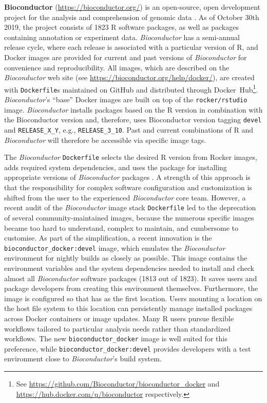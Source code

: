 \textbf{Bioconductor} (\url{https://bioconductor.org/}) is an
open-source, open development project for the analysis and comprehension
of genomic data \citep{gentleman_bioconductor_2004}. As of October 30th
2019, the project consists of 1823 R software packages, as well as
packages containing annotation or experiment data. \emph{Bioconductor}
has a semi-annual release cycle, where each release is associated with a
particular version of R, and Docker images are provided for current and
past versions of \emph{Bioconductor} for convenience and
reproducibility. All images, which are described on the
\emph{Bioconductor} web site (see
\url{https://bioconductor.org/help/docker/}), are created with
\texttt{Dockerfile}s maintained on GitHub and distributed through
Docker~Hub\footnote{See \href{https://github.com/Bioconductor/bioconductor_docker}{https://github.com/Bioconductor/bioconductor\_docker} and \href{https://hub.docker.com/u/bioconductor}{https://hub.docker.com/u/bioconductor} respectively.}.
\emph{Bioconductor}'s ``base'' Docker images are built on top of the
\texttt{rocker/rstudio} image. \emph{Bioconductor} installs packages
based on the R version in combination with the Bioconductor version and,
therefore, uses Bioconductor version tagging \texttt{devel} and
\texttt{RELEASE\_X\_Y}, e.g., \texttt{RELEASE\_3\_10}. Past and current
combinations of R and \emph{Bioconductor} will therefore be accessible
via specific image tags.

The \emph{Bioconductor} \texttt{Dockerfile} selects the desired R
version from Rocker images, adds required system dependencies, and uses
the  package for installing appropriate versions of
\emph{Bioconductor} packages \citep{cran_biocmanager}. A strength of
this approach is that the responsibility for complex software
configuration and customization is shifted from the user to the
experienced \emph{Bioconductor} core team. However, a recent audit of
the \emph{Bioconductor} image stack \texttt{Dockerfile} led to the
deprecation of several community-maintained images, because the numerous
specific images became too hard to understand, complex to maintain, and
cumbersome to customise. As part of the simplification, a recent
innovation is the \texttt{bioconductor\_docker:devel} image, which
emulates the \emph{Bioconductor} environment for nightly builds as
closely as possible. This image contains the environment variables and
the system dependencies needed to install and check almost all
\emph{Bioconductor} software packages (1813 out of 1823). It saves users
and package developers from creating this environment themselves.
Furthermore, the image is configured so that  has
 as the first location. Users
mounting a location on the host file system to this location can
persistently manage installed packages across Docker containers or image
updates. Many R users pursue flexible workflows tailored to particular
analysis needs rather than standardized workflows. The new
\texttt{bioconductor\_docker} image is well suited for this preference,
while \texttt{bioconductor\_docker:devel} provides developers with a
test environment close to \emph{Bioconductor}'s build system.


